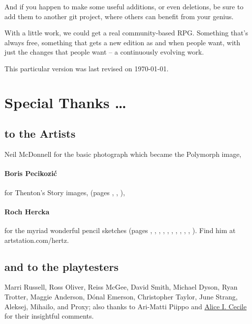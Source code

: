 \begin{multicols}{2}
And if you happen to make some useful additions, or even deletions, be sure to add them to another git project, where others can benefit from your genius.

With a little work, we could get a real community-based RPG.
Something that's always free, something that gets a new edition as and when people want, with just the changes that people want -- a continuously evolving work.

This particular version was last revised on \today.

\end{multicols}

\section*{Special Thanks \ldots}

\begin{multicols}{2}

\subsection*{to the Artists}

Neil McDonnell for the basic photograph which became the Polymorph image,

\paragraph{Boris Pecikozi\'c} for Thenton's Story images, (pages 
\pageref{boris:jump}, 
\pageref{boris:brawl}, 
\pageref{boris:meet}), 


\paragraph{Roch Hercka} for the myriad wonderful pencil sketches (pages 
\pageref{roch:races}, 
\pageref{roch:dwarf}, 
\pageref{roch:stances}, 
\pageref{roch:vitals}, 
\pageref{roch:xp1}, 
\pageref{roch:xp2}, 
\pageref{roch:enchanter}, 
\pageref{roch:polymorph}, 
\pageref{roch:runes}, 
\pageref{roch:trogdor}, 
\pageref{roch:light}
).
Find him at artstation.com/hertz.

\subsection*{and to the playtesters} Marri Russell, Ross Oliver, Reiss McGee, David Smith, Michael Dyson, Ryan Trotter, Maggie Anderson, 
D\'{o}nal Emerson, Christopher Taylor, June Strang, 
Aleksej, Mihailo, and Proxy;
also thanks to Ari-Matti Piippo and \href{https://www.twitter.com/AliceICecile}{Alice I. Cecile} for their insightful comments.

\end{multicols}

